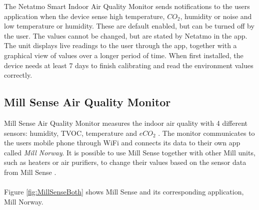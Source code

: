 The Netatmo Smart Indoor Air Quality Monitor sends notifications to the users application when the device sense high temperature, \(CO_2\), humidity or noise and low temperature or humidity. These are default enabled, but can be turned off by the user. The values cannot be changed, but are stated by Netatmo in the app. The unit displays live readings to the user through the app, together with a graphical view of values over a longer period of time. When first installed, the device needs at least 7 days to finish calibrating and read the environment values correctly. 


\subsection{Mill Sense Air Quality Monitor}
Mill Sense Air Quality Monitor measures the indoor air quality with 4 different sensors: humidity, TVOC, temperature and \(eCO_2\) \cite{Mill}. The monitor communicates to the users mobile phone through WiFi and connects its data to their own app called \textit{Mill Norway}. It is possible to use Mill Sense together with other Mill units, such as heaters or air purifiers,  to change their values based on the sensor data from Mill Sense \cite{Mill}. 
\\\\
Figure \ref{fig:MillSenseBoth} shows Mill Sense and its corresponding application, Mill Norway. 

